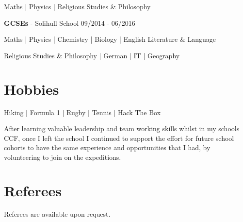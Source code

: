 \documentclass{article}
\begin{document}
\begin{center}
Maths | Physics | Religious Studies \& Philosophy
\end{center}

\textbf{GCSEs} - Solihull School \hfill 09/2014 - 06/2016
\begin{center}
Maths | Physics | Chemistry | Biology | English Literature \& Language

Religious Studies \& Philosophy | German | IT | Geography
\end{center}

\section*{Hobbies}

\begin{center}
Hiking | Formula 1 | Rugby | Tennis | Hack The Box
\end{center}

After learning valuable leadership and team working skills whilst in my schools CCF, once I left the school I continued to support the effort for future school cohorts to have the same experience and opportunities that I had, by volunteering to join on the expeditions.

\section*{Referees}

Referees are available upon request.
\end{document}

